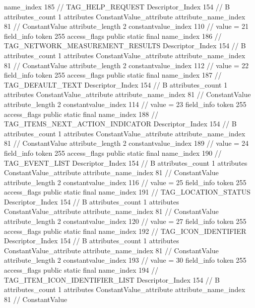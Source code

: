 {{{{{				name_index	185		// TAG_HELP_REQUEST
				Descriptor_Index	154		// B
				attributes_count	1
				attributes {
				ConstantValue_attribute {
					attribute_name_index	81		// ConstantValue
					attribute_length	2
					constantvalue_index	110		// value = 21
				}
				}
			}
			field_info {
				token	255
				access_flags	public static final
				name_index	186		// TAG_NETWORK_MEASUREMENT_RESULTS
				Descriptor_Index	154		// B
				attributes_count	1
				attributes {
				ConstantValue_attribute {
					attribute_name_index	81		// ConstantValue
					attribute_length	2
					constantvalue_index	112		// value = 22
				}
				}
			}
			field_info {
				token	255
				access_flags	public static final
				name_index	187		// TAG_DEFAULT_TEXT
				Descriptor_Index	154		// B
				attributes_count	1
				attributes {
				ConstantValue_attribute {
					attribute_name_index	81		// ConstantValue
					attribute_length	2
					constantvalue_index	114		// value = 23
				}
				}
			}
			field_info {
				token	255
				access_flags	public static final
				name_index	188		// TAG_ITEMS_NEXT_ACTION_INDICATOR
				Descriptor_Index	154		// B
				attributes_count	1
				attributes {
				ConstantValue_attribute {
					attribute_name_index	81		// ConstantValue
					attribute_length	2
					constantvalue_index	189		// value = 24
				}
				}
			}
			field_info {
				token	255
				access_flags	public static final
				name_index	190		// TAG_EVENT_LIST
				Descriptor_Index	154		// B
				attributes_count	1
				attributes {
				ConstantValue_attribute {
					attribute_name_index	81		// ConstantValue
					attribute_length	2
					constantvalue_index	116		// value = 25
				}
				}
			}
			field_info {
				token	255
				access_flags	public static final
				name_index	191		// TAG_LOCATION_STATUS
				Descriptor_Index	154		// B
				attributes_count	1
				attributes {
				ConstantValue_attribute {
					attribute_name_index	81		// ConstantValue
					attribute_length	2
					constantvalue_index	120		// value = 27
				}
				}
			}
			field_info {
				token	255
				access_flags	public static final
				name_index	192		// TAG_ICON_IDENTIFIER
				Descriptor_Index	154		// B
				attributes_count	1
				attributes {
				ConstantValue_attribute {
					attribute_name_index	81		// ConstantValue
					attribute_length	2
					constantvalue_index	193		// value = 30
				}
				}
			}
			field_info {
				token	255
				access_flags	public static final
				name_index	194		// TAG_ITEM_ICON_IDENTIFIER_LIST
				Descriptor_Index	154		// B
				attributes_count	1
				attributes {
				ConstantValue_attribute {
					attribute_name_index	81		// ConstantValue
}}}}}}}
